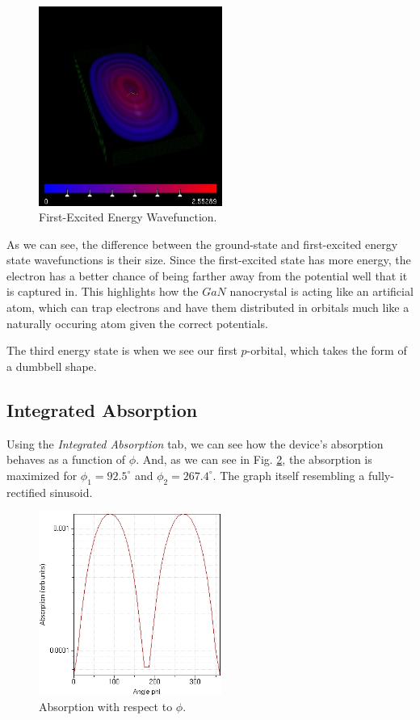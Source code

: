 \documentclass{IEEEtran}
\begin{document}
\begin{figure}[!h] 
    \centering
    \includegraphics*[width = 6cm]{energytwo.jpg}
    \caption{First-Excited Energy Wavefunction.}
    \label{fig:energytwo}
\end{figure}    

As we can see, the difference between the ground-state and first-excited energy state wavefunctions is their size. Since the first-excited state has more energy, the electron has a better chance of being farther away from the potential well that it is captured in. This highlights how the \(GaN\) nanocrystal is acting like an artificial atom, which can trap electrons and have them distributed in orbitals much like a naturally occuring atom given the correct potentials.

The third energy state is when we see our first \(p\)-orbital, which takes the form of a dumbbell shape. 

\subsection{Integrated Absorption}

Using the \textit{Integrated Absorption} tab, we can see how the device's absorption behaves as a function of \(\phi\). And, as we can see in Fig. \ref{fig:integratedabsorption}, the absorption is maximized for \(\phi_1 = 92.5^\circ\) and \(\phi_2 = 267.4^\circ\). The graph itself resembling a fully-rectified sinusoid.  

\begin{figure}[!t] 
    \centering
    \includegraphics*[width = 6cm]{IntegratedAbsorption2.jpg}
    \caption{Absorption with respect to \(\phi\).}
    \label{fig:integratedabsorption}
\end{figure} 
\end{document}
